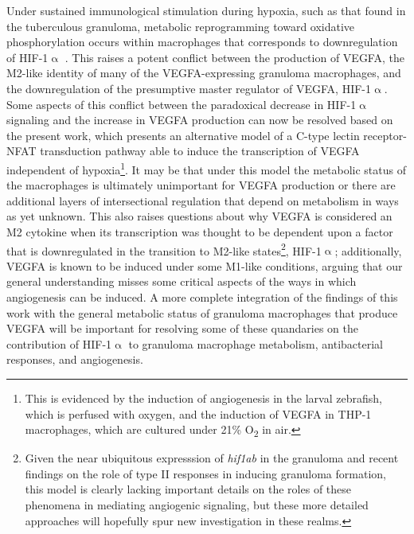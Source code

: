 Under sustained immunological stimulation during hypoxia, such as that found in the tuberculous granuloma, metabolic reprogramming toward oxidative phosphorylation occurs within macrophages that corresponds to downregulation of HIF\hyp{}1$\upalpha$ \citep{Mehrotra2014, Wilson2019}. This raises a potent conflict between the production of VEGFA, the M2\hyp{}like identity of many of the VEGFA\hyp{}expressing granuloma macrophages, and the downregulation of the presumptive master regulator of VEGFA, HIF\hyp{}1$\upalpha$. Some aspects of this conflict between the paradoxical decrease in HIF\hyp{}1$\upalpha$ signaling and the increase in VEGFA production can now be resolved based on the present work, which presents an alternative model of a C\hyp{}type lectin receptor\hyp{}NFAT transduction pathway able to induce the transcription of VEGFA independent of hypoxia\footnote{This is evidenced by the induction of angiogenesis in the larval zebrafish, which is perfused with oxygen, and the induction of VEGFA in THP\hyp{}1 macrophages, which are cultured under 21\% O\textsubscript{2} in air.}. It may be that under this model the metabolic status of the macrophages is ultimately unimportant for VEGFA production or there are additional layers of intersectional regulation that depend on metabolism in ways as yet unknown. This also raises questions about why VEGFA is considered an M2 cytokine when its transcription was thought to be dependent upon a factor that is downregulated in the transition to M2\hyp{}like states\footnote{Given the near ubiquitous expresssion of \textit{hif1ab} in the granuloma and recent findings on the role of type II responses in inducing granuloma formation, this model is clearly lacking important details on the roles of these phenomena in mediating angiogenic signaling, but these more detailed approaches will hopefully spur new investigation in these realms.}, HIF\hyp{}1$\upalpha$; additionally, VEGFA is known to be induced under some M1\hyp{}like conditions, arguing that our general understanding misses some critical aspects of the ways in which angiogenesis can be induced. A more complete integration of the findings of this work with the general metabolic status of granuloma macrophages that produce VEGFA will be important for resolving some of these quandaries on the contribution of HIF\hyp{}1$\upalpha$ to granuloma macrophage metabolism, antibacterial responses, and angiogenesis.

